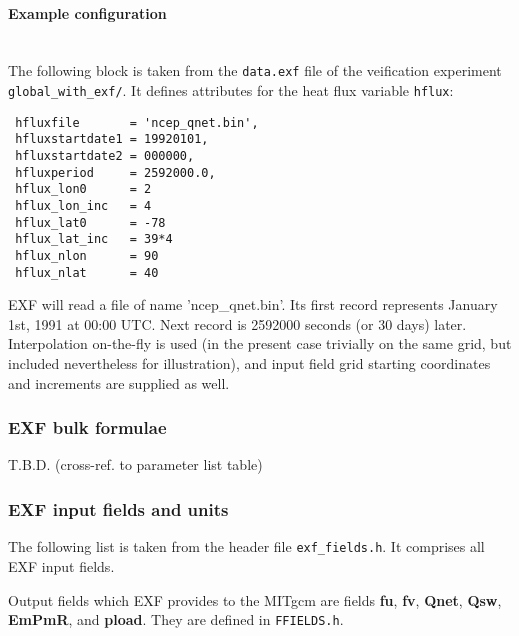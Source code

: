\paragraph{Example configuration} ~ \\
%
The following block is taken from the \texttt{data.exf} file
of the veification experiment \texttt{global\_with\_exf/}.
It defines attributes for the heat flux variable \texttt{hflux}:

\begin{verbatim}
 hfluxfile       = 'ncep_qnet.bin',
 hfluxstartdate1 = 19920101,
 hfluxstartdate2 = 000000,
 hfluxperiod     = 2592000.0,
 hflux_lon0      = 2
 hflux_lon_inc   = 4
 hflux_lat0      = -78
 hflux_lat_inc   = 39*4
 hflux_nlon      = 90
 hflux_nlat      = 40
\end{verbatim}

EXF will read a file of name 'ncep\_qnet.bin'.
Its first record represents January 1st, 1991 at 00:00 UTC.
Next record is 2592000 seconds (or 30 days) later.
Interpolation on-the-fly is used (in the present case trivially
on the same grid, but included nevertheless for illustration), 
and input field grid starting coordinates and increments are 
supplied as well.


\subsubsection{EXF bulk formulae
\label{sec:pkg:exf:bulk_formulae}}

T.B.D. (cross-ref. to parameter list table)


\subsubsection{EXF input fields and units
\label{sec:pkg:exf:fields_units}}

The following list is taken from the header file \texttt{exf\_fields.h}.
It comprises all EXF input fields.

Output fields which EXF provides to the MITgcm are fields
\textbf{fu}, \textbf{fv}, \textbf{Qnet}, \textbf{Qsw}, \textbf{EmPmR},
and \textbf{pload}. They are defined in \texttt{FFIELDS.h}.

